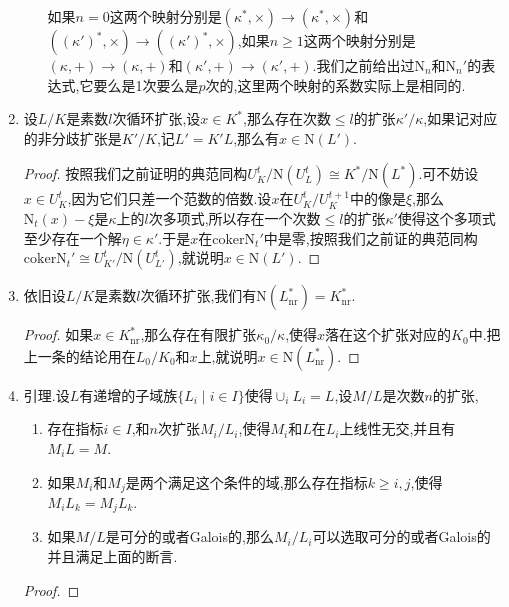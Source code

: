 \begin{enumerate}
\begin{enumerate}
	    如果$n=0$这两个映射分别是$(\kappa^*,\times)\to(\kappa^*,\times)$和$((\kappa')^*,\times)\to((\kappa')^*,\times)$,如果$n\ge1$这两个映射分别是$(\kappa,+)\to(\kappa,+)$和$(\kappa',+)\to(\kappa',+)$.我们之前给出过$\mathrm{N}_n$和$\mathrm{N}_n'$的表达式,它要么是1次要么是$p$次的,这里两个映射的系数实际上是相同的.
	\end{enumerate}
	\item 设$L/K$是素数$l$次循环扩张,设$x\in K^*$,那么存在次数$\le l$的扩张$\kappa'/\kappa$,如果记对应的非分歧扩张是$K'/K$,记$L'=K'L$,那么有$x\in\mathrm{N}(L')$.
	\begin{proof}
		
		按照我们之前证明的典范同构$U_K^t/\mathrm{N}(U_L^t)\cong K^*/\mathrm{N}(L^*)$.可不妨设$x\in U_K^t$,因为它们只差一个范数的倍数.设$x$在$U_K^t/U_K^{t+1}$中的像是$\xi$,那么$\mathrm{N}_t(x)-\xi$是$\kappa$上的$l$次多项式,所以存在一个次数$\le l$的扩张$\kappa'$使得这个多项式至少存在一个解$\eta\in\kappa'$.于是$x$在$\mathrm{coker}\mathrm{N}_t'$中是零,按照我们之前证的典范同构$\mathrm{coker}\mathrm{N}_t'\cong U_{K'}^t/\mathrm{N}(U_{L'}^t)$,就说明$x\in\mathrm{N}(L')$.
	\end{proof}
	\item 依旧设$L/K$是素数$l$次循环扩张,我们有$\mathrm{N}(L_{\mathrm{nr}}^*)=K_{\mathrm{nr}}^*$.
	\begin{proof}
		
		如果$x\in K_{\mathrm{nr}}^*$,那么存在有限扩张$\kappa_0/\kappa$,使得$x$落在这个扩张对应的$K_0$中.把上一条的结论用在$L_0/K_0$和$x$上,就说明$x\in\mathrm{N}(L_{\mathrm{nr}}^*)$.
	\end{proof}
    \item 引理.设$L$有递增的子域族$\{L_i\mid i\in I\}$使得$\cup_iL_i=L$,设$M/L$是次数$n$的扩张,
    \begin{enumerate}
    	\item 存在指标$i\in I$,和$n$次扩张$M_i/L_i$,使得$M_i$和$L$在$L_i$上线性无交,并且有$M_iL=M$.
    	\item 如果$M_i$和$M_j$是两个满足这个条件的域,那么存在指标$k\ge i,j$,使得$M_iL_k=M_jL_k$.
    	\item 如果$M/L$是可分的或者Galois的,那么$M_i/L_i$可以选取可分的或者Galois的并且满足上面的断言.
    \end{enumerate}
    \begin{proof}
    	

\end{proof}
\end{enumerate}
